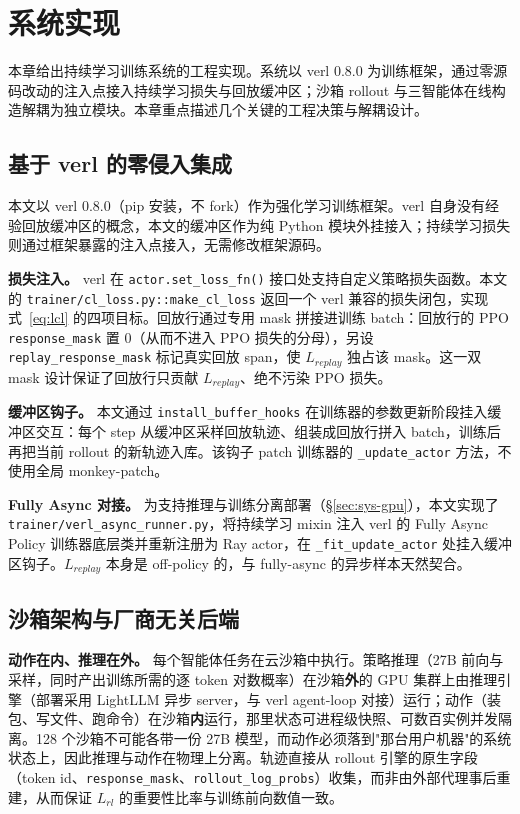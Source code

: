 \chapter{系统实现}
\label{chap:system}

本章给出持续学习训练系统的工程实现。系统以 verl 0.8.0 为训练框架，通过零源码改动的注入点接入持续学习损失与回放缓冲区；沙箱 rollout 与三智能体在线构造解耦为独立模块。本章重点描述几个关键的工程决策与解耦设计。

\section{基于 verl 的零侵入集成}
\label{sec:sys-verl}

本文以 verl 0.8.0（pip 安装，不 fork）作为强化学习训练框架。verl 自身没有经验回放缓冲区的概念，本文的缓冲区作为纯 Python 模块外挂接入；持续学习损失则通过框架暴露的注入点接入，无需修改框架源码。

\textbf{损失注入。} verl 在 \texttt{actor.set\_loss\_fn()} 接口处支持自定义策略损失函数。本文的 \texttt{trainer/cl\_loss.py::make\_cl\_loss} 返回一个 verl 兼容的损失闭包，实现式~\eqref{eq:lcl} 的四项目标。回放行通过专用 mask 拼接进训练 batch：回放行的 PPO \texttt{response\_mask} 置 0（从而不进入 PPO 损失的分母），另设 \texttt{replay\_response\_mask} 标记真实回放 span，使 $L_{replay}$ 独占该 mask。这一双 mask 设计保证了回放行只贡献 $L_{replay}$、绝不污染 PPO 损失。

\textbf{缓冲区钩子。} 本文通过 \texttt{install\_buffer\_hooks} 在训练器的参数更新阶段挂入缓冲区交互：每个 step 从缓冲区采样回放轨迹、组装成回放行拼入 batch，训练后再把当前 rollout 的新轨迹入库。该钩子 patch 训练器的 \texttt{\_update\_actor} 方法，不使用全局 monkey-patch。

\textbf{Fully Async 对接。} 为支持推理与训练分离部署（\S\ref{sec:sys-gpu}），本文实现了 \texttt{trainer/verl\_async\_runner.py}，将持续学习 mixin 注入 verl 的 Fully Async Policy 训练器底层类并重新注册为 Ray actor，在 \texttt{\_fit\_update\_actor} 处挂入缓冲区钩子。$L_{replay}$ 本身是 off-policy 的，与 fully-async 的异步样本天然契合。

\section{沙箱架构与厂商无关后端}
\label{sec:sys-sandbox}

\textbf{动作在内、推理在外。} 每个智能体任务在云沙箱中执行。策略推理（27B 前向与采样，同时产出训练所需的逐 token 对数概率）在沙箱\textbf{外}的 GPU 集群上由推理引擎（部署采用 LightLLM 异步 server，与 verl agent-loop 对接）运行；动作（装包、写文件、跑命令）在沙箱\textbf{内}运行，那里状态可进程级快照、可数百实例并发隔离。128 个沙箱不可能各带一份 27B 模型，而动作必须落到"那台用户机器"的系统状态上，因此推理与动作在物理上分离。轨迹直接从 rollout 引擎的原生字段（token id、\texttt{response\_mask}、\texttt{rollout\_log\_probs}）收集，而非由外部代理事后重建，从而保证 $L_{rl}$ 的重要性比率与训练前向数值一致。

